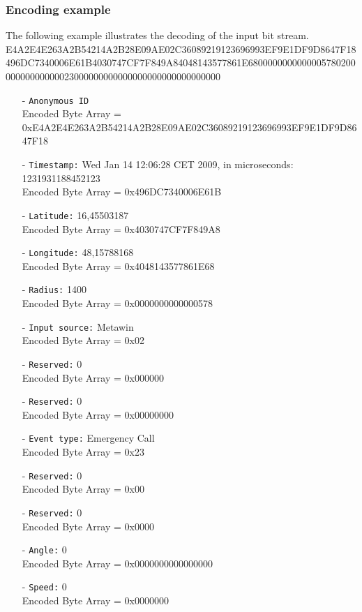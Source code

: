 \documentclass[master,english]{hgbthesis}
\begin{document}
\subsubsection{Encoding example}
The following example illustrates the decoding of the input bit stream.\\
E4A2E4E263A2B54214A2B28E09AE02C36089219123696993EF9E1DF9D8647F18\\
496DC7340006E61B4030747CF7F849A84048143577861E6800000000000005780200\\
00000000000023000000000000000000000000000000
\begin{itemize}
	\item[-] \verb+Anonymous ID+
	      \\Encoded Byte Array = 0xE4A2E4E263A2B54214A2B28E09\-AE02C360\-89219123696993EF9E1DF9D8647F18
	\item[-] \verb|Timestamp:| Wed Jan 14 12:06:28 CET 2009, in microseconds: 1231931188452123
	      \\Encoded Byte Array = 0x496DC7340006E61B
	\item[-] \verb|Latitude:| 16,45503187
	      \\Encoded Byte Array = 0x4030747CF7F849A8
	\item[-] \verb|Longitude:| 48,15788168
	      \\Encoded Byte Array = 0x4048143577861E68
	\item[-] \verb|Radius:| 1400
	      \\Encoded Byte Array = 0x0000000000000578
	\item[-] \verb|Input source:| Metawin
	      \\Encoded Byte Array = 0x02
	\item[-] \verb|Reserved:| 0
	      \\Encoded Byte Array = 0x000000
	\item[-] \verb|Reserved:| 0
	      \\Encoded Byte Array = 0x00000000
	\item[-] \verb|Event type:| Emergency Call
	      \\Encoded Byte Array = 0x23
	\item[-] \verb|Reserved:| 0
	      \\Encoded Byte Array = 0x00
	\item[-] \verb|Reserved:| 0
	      \\Encoded Byte Array = 0x0000
	\item[-] \verb|Angle:| 0
	      \\Encoded Byte Array = 0x0000000000000000
	\item[-] \verb|Speed:| 0
	      \\Encoded Byte Array = 0x0000000
\end{itemize}
\end{document}
